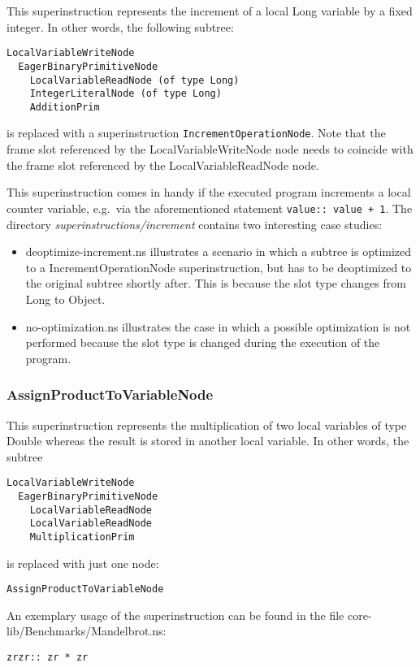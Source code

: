 \documentclass[10pt,a4paper]{article}
\begin{document}
This superinstruction represents the increment of a local \textsf{Long} variable by a fixed integer.
In other words, the following subtree:

\begin{verbatim}
LocalVariableWriteNode
  EagerBinaryPrimitiveNode
    LocalVariableReadNode (of type Long)
    IntegerLiteralNode (of type Long)
    AdditionPrim
\end{verbatim}

is replaced with a superinstruction \verb|IncrementOperationNode|. Note that the frame slot referenced by the \textsf{LocalVariableWriteNode} node needs to coincide with the frame slot referenced by the \textsf{LocalVariableReadNode} node.

This superinstruction comes in handy if the executed program increments a local counter variable, e.g.\ via the aforementioned statement \verb|value:: value + 1|. The directory \emph{superinstructions/increment} contains two interesting case studies:

\begin{itemize}
	\item \textsf{deoptimize-increment.ns} illustrates a scenario in which a subtree is optimized to a \textsf{IncrementOperationNode} superinstruction, but has to be deoptimized to the original subtree shortly after. This is because the slot type changes from \textsf{Long} to \textsf{Object}.
	\item \textsf{no-optimization.ns} illustrates the case in which a possible optimization is not performed because the slot type is changed during the execution of the program.
\end{itemize}

\subsubsection{AssignProductToVariableNode}

This superinstruction represents the multiplication of two local variables of type \textsf{Double} whereas the result is stored in another local variable. In other words, the subtree

\begin{verbatim}
LocalVariableWriteNode
  EagerBinaryPrimitiveNode
    LocalVariableReadNode
    LocalVariableReadNode
    MultiplicationPrim
\end{verbatim}
is replaced with just one node:
\begin{verbatim}
AssignProductToVariableNode
\end{verbatim}
An exemplary usage of the superinstruction can be found in the file \textsf{core-lib/Benchmarks/Mandelbrot.ns}:
\begin{verbatim}
zrzr:: zr * zr
\end{verbatim}
\end{document}
